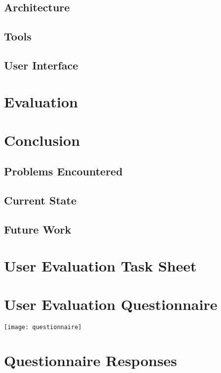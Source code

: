 \documentclass{l4proj}
\begin{document}
\section{Architecture}

\section{Tools}

\section{User Interface}


\chapter{Evaluation}


\chapter{Conclusion}
\section{Problems Encountered}

\section{Current State}

\section{Future Work}


\appendix
\chapter{User Evaluation Task Sheet}
\label{app:tasksheet}


\chapter{User Evaluation Questionnaire}
\label{app:questionnaire}
\newpage
\texttt{[image: questionnaire]}

\chapter{Questionnaire Responses}
\label{app:feedback}



\end{document}
